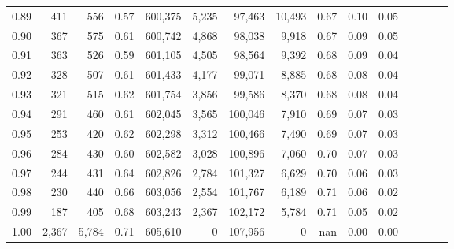 \begin{tabular}{rrrcrrrrrrrrrrr}
0.89 &     411 &    556 &                                       0.57 &  600,375 &    5,235 &   97,463 &   10,493 &  0.67 &  0.10 &                         0.05 \\
0.90 &     367 &    575 &                                       0.61 &  600,742 &    4,868 &   98,038 &    9,918 &  0.67 &  0.09 &                         0.05 \\
0.91 &     363 &    526 &                                       0.59 &  601,105 &    4,505 &   98,564 &    9,392 &  0.68 &  0.09 &                         0.04 \\
0.92 &     328 &    507 &                                       0.61 &  601,433 &    4,177 &   99,071 &    8,885 &  0.68 &  0.08 &                         0.04 \\
0.93 &     321 &    515 &                                       0.62 &  601,754 &    3,856 &   99,586 &    8,370 &  0.68 &  0.08 &                         0.04 \\
0.94 &     291 &    460 &                                       0.61 &  602,045 &    3,565 &  100,046 &    7,910 &  0.69 &  0.07 &                         0.03 \\
0.95 &     253 &    420 &                                       0.62 &  602,298 &    3,312 &  100,466 &    7,490 &  0.69 &  0.07 &                         0.03 \\
0.96 &     284 &    430 &                                       0.60 &  602,582 &    3,028 &  100,896 &    7,060 &  0.70 &  0.07 &                         0.03 \\
0.97 &     244 &    431 &                                       0.64 &  602,826 &    2,784 &  101,327 &    6,629 &  0.70 &  0.06 &                         0.03 \\
0.98 &     230 &    440 &                                       0.66 &  603,056 &    2,554 &  101,767 &    6,189 &  0.71 &  0.06 &                         0.02 \\
0.99 &     187 &    405 &                                       0.68 &  603,243 &    2,367 &  102,172 &    5,784 &  0.71 &  0.05 &                         0.02 \\
1.00 &   2,367 &  5,784 &                                       0.71 &  605,610 &        0 &  107,956 &        0 &   nan &  0.00 &                         0.00 \\
\bottomrule
\end{tabular}

